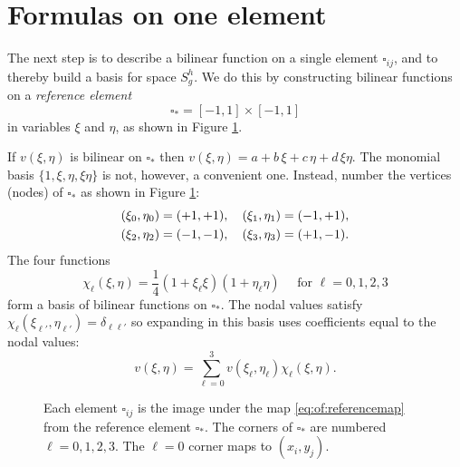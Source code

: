 \section{Formulas on one element}

The next step is to describe a bilinear function on a single element $\square_{ij}$, and to thereby build a basis for space $S_g^h$.  We do this by constructing bilinear functions on a \emph{reference element}
    $$\square_\ast = [-1,1]\times[-1,1]$$
in variables $\xi$ and $\eta$, as shown in Figure \ref{fig:of:q1gridandref}.

If $v(\xi,\eta)$ is bilinear on $\square_\ast$ then $v(\xi,\eta) = a + b\, \xi + c\, \eta + d\, \xi \eta$.  The monomial basis $\{1,\xi,\eta,\xi\eta\}$ is not, however, a convenient one.  Instead, number the vertices (nodes) of $\square_\ast$ as shown in Figure \ref{fig:of:q1gridandref}:
\begin{align}
(\xi_0,\eta_0) &= (+1,+1), \quad (\xi_1,\eta_1) = (-1,+1),    \label{eq:of:refcorners} \\
(\xi_2,\eta_2) &= (-1,-1), \quad (\xi_3,\eta_3) = (+1,-1). \notag
\end{align}
The four functions
\begin{equation}
\chi_\ell(\xi,\eta) = \frac{1}{4} \left(1 + \xi_\ell \xi\right) \left(1 + \eta_\ell \eta\right)  \quad \text{ for } \ell=0,1,2,3 \label{eq:of:chidefn}
\end{equation}
form a basis of bilinear functions on $\square_\ast$.  The nodal values satisfy $\chi_\ell(\xi_{\ell'},\eta_{\ell'}) = \delta_{\ell\ell'}$ so expanding in this basis uses coefficients equal to the nodal values:
\begin{equation}
v(\xi,\eta) = \sum_{\ell=0}^3 v(\xi_\ell,\eta_\ell) \chi_\ell(\xi,\eta). \label{eq:of:bilinearrepresentationref}
\end{equation}

\begin{figure}

\caption{Each element $\square_{ij}$ is the image under the map \eqref{eq:of:referencemap} from the reference element $\square_\ast$.  The corners of $\square_\ast$ are numbered $\ell=0,1,2,3$.  The $\ell=0$ corner maps to $(x_i,y_j)$.}
\label{fig:of:q1gridandref}
\end{figure}

